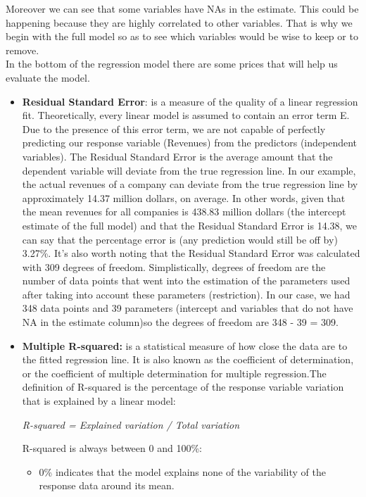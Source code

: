 \documentclass{book}
\begin{document}
Moreover we can see that some variables have NAs in the estimate. This could be happening because they are highly correlated to other variables. That is why we begin with the full model so as to see which variables would be wise to keep or to remove.\\
In the bottom of the regression model there are some prices that will help us evaluate the model.
\begin{itemize}
\item \textbf{Residual Standard Error}: is a measure of the quality of a linear regression fit. Theoretically, every linear model is assumed to contain an error term E. Due to the presence of this error term, we are not capable of perfectly predicting our response variable (Revenues) from the predictors (independent variables). The Residual Standard Error is the average amount that the dependent variable will deviate from the true regression line. In our example, the actual revenues of a company can deviate from the true regression line by approximately 14.37 million dollars, on average. In other words, given that the mean revenues for all companies is 438.83 million dollars (the intercept estimate of the full model) and that the Residual Standard Error is 14.38, we can say that the percentage error is (any prediction would still be off by) 3.27\%. It’s also worth noting that the Residual Standard Error was calculated with 309 degrees of freedom. Simplistically, degrees of freedom are the number of data points that went into the estimation of the parameters used after taking into account these parameters (restriction). In our case, we had 348 data points and 39 parameters (intercept and variables that do not have NA in the estimate column)so the degrees of freedom are 348 - 39 = 309.
\item \textbf{Multiple R-squared:} is a statistical measure of how close the data are to the fitted regression line. It is also known as the coefficient of determination, or the coefficient of multiple determination for multiple regression.The definition of R-squared is the percentage of the response variable variation that is explained by a linear model:
\begin{center}
\textit{R-squared = Explained variation / Total variation}
\end{center}
R-squared is always between 0 and 100\%:
\begin{itemize}
\item 0\% indicates that the model explains none of the variability of the response data around its mean.

\end{itemize}
\end{itemize}
\end{document}
